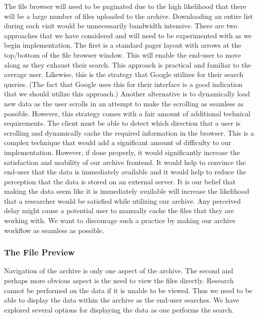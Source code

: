 \documentclass[12pt]{report}
\begin{document}
The file browser will need to be paginated due to the high likelihood that there will be a large number of files uploaded to the archive. Downloading an entire list during each visit would be unnecessarily bandwidth intensive. There are two approaches that we have considered and will need to be experimented with as we begin implementation. The first is a standard pager layout with arrows at the top/bottom of the file browser window. This will enable the end-user to move along as they exhaust their search. This approach is practical and familiar to the average user. Likewise, this is the strategy that Google utilizes for their search queries. (The fact that Google uses this for their interface is a good indication that we should utilize this approach.) Another alternative is to dynamically load new data as the user scrolls in an attempt to make the scrolling as seamless as possible. However, this strategy comes with a fair amount of additional technical requirements. The client must be able to detect which direction that a user is scrolling and dynamically cache the required information in the browser. This is a complex technique that would add a significant amount of difficulty to our implementation. However, if done properly, it would significantly increase the satisfaction and usability of our archive frontend. It would help to convince the end-user that the data is immediately available and it would help to reduce the perception that the data is stored on an external server. It is our belief that making the data seem like it is immediately available will increase the likelihood that a researcher would be satisfied while utilizing our archive. Any perceived delay might cause a potential user to manually cache the files that they are working with. We want to discourage such a practice by making our archive workflow as seamless as possible.

\subsubsection*{The File Preview}

Navigation of the archive is only one aspect of the archive. The second and perhaps more obvious aspect is the need to view the files directly. Research cannot be performed on the data if it is unable to be viewed. Thus we need to be able to display the data within the archive as the end-user searches. We have explored several options for displaying the data as one performs the search.
\end{document}

